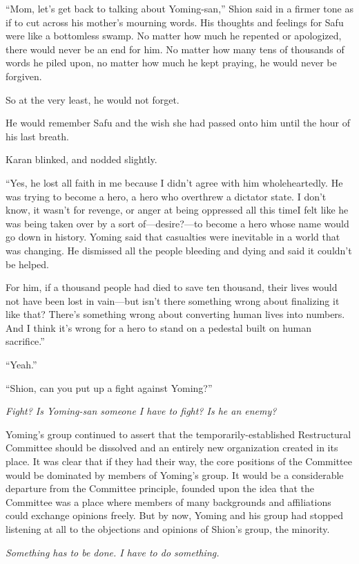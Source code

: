 ``Mom, let's get back to talking about Yoming-san,'' Shion said in a
firmer tone as if to cut across his mother's mourning words. His
thoughts and feelings for Safu were like a bottomless swamp. No matter
how much he repented or apologized, there would never be an end for him.
No matter how many tens of thousands of words he piled upon, no matter
how much he kept praying, he would never be forgiven.

So at the very least, he would not forget.

He would remember Safu and the wish she had passed onto him until the
hour of his last breath.

Karan blinked, and nodded slightly.

``Yes, he lost all faith in me because I didn't agree with him
wholeheartedly. He was trying to become a hero, a hero who overthrew a
dictator state. I don't know, it wasn't for revenge, or anger at being
oppressed all this time\el I felt like he was being taken over by a sort
of---desire?---to become a hero whose name would go down in history. Yoming
said that casualties were inevitable in a world that was changing. He
dismissed all the people bleeding and dying and said it couldn't be
helped.

For him, if a thousand people had died to save ten thousand, their lives
would not have been lost in vain---but isn't there something wrong about
finalizing it like that? There's something wrong about converting human
lives into numbers. And I think it's wrong for a hero to stand on a
pedestal built on human sacrifice.''

``\el Yeah.''

``Shion, can you put up a fight against Yoming?''

\emph{Fight? Is Yoming-san someone I have to fight? Is he an enemy?}

Yoming's group continued to assert that the temporarily-established
Restructural Committee should be dissolved and an entirely new
organization created in its place. It was clear that if they had their
way, the core positions of the Committee would be dominated by members
of Yoming's group. It would be a considerable departure from the
Committee principle, founded upon the idea that the Committee was a
place where members of many backgrounds and affiliations could exchange
opinions freely. But by now, Yoming and his group had stopped listening
at all to the objections and opinions of Shion's group, the minority.

\emph{Something has to be done. I have to do something.}

